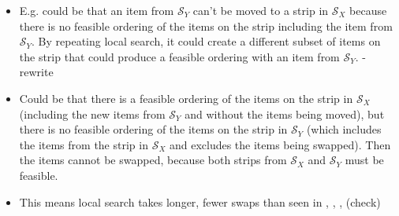 \documentclass{elsarticle}
\begin{document}
\begin{itemize}
	\item E.g. could be that an item from $\mathcal{S}_Y$ can't be moved to a strip in $\mathcal{S}_X$ because there is no feasible ordering of the items on the strip including the item from $\mathcal{S}_Y$. By repeating local search, it could create a different subset of items on the strip that could produce a feasible ordering with an item from $\mathcal{S}_Y$. - rewrite
	\item Could be that there is a feasible ordering of the items on the strip in $\mathcal{S}_X$ (including the new items from $\mathcal{S}_Y$ and without the items being moved), but there is no feasible ordering of the items on the strip in $\mathcal{S}_Y$ (which includes the items from the strip in $\mathcal{S}_X$ and excludes the items being swapped). Then the items cannot be swapped, because both strips from $\mathcal{S}_X$ and $\mathcal{S}_Y$ must be feasible. 
	\item This means local search takes longer, fewer swaps than seen in \cite{lewis2009}, \cite{lewis2017}, \cite{levine2004}, \cite{falkenauer1996} (check)
\end{itemize}
\end{document}
